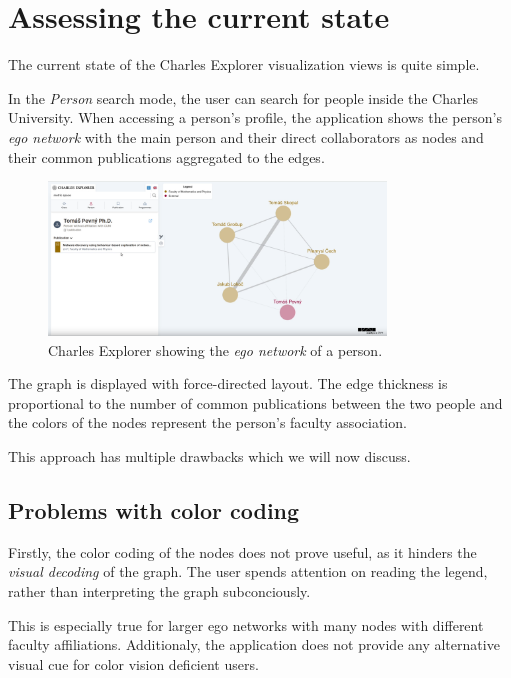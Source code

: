 \section{Assessing the current state} \label{sec:current-state}

The current state of the Charles Explorer visualization views is quite simple. 

In the \textit{Person} search mode, the user can search for people inside the Charles University. 
When accessing a person's profile, the application shows the person's \textit{ego network} with the main person and their direct collaborators 
as nodes and their common publications aggregated to the edges.

\begin{figure}[ht!]
    \captionsetup{width=.9\linewidth}
    \includegraphics[width=0.8\textwidth]{../img/charles-explorer-old-view.png}
    \centering
    \caption{Charles Explorer showing the \textit{ego network} of a person.}
\end{figure}

The graph is displayed with force-directed layout. The edge thickness is proportional to the number of common publications between 
the two people and the colors of the nodes represent the person's faculty association.

This approach has multiple drawbacks which we will now discuss.

\subsection{Problems with color coding} \label{sec:color-coding}

Firstly, the color coding of the nodes does not prove useful, as it hinders the \textit{visual decoding} of the graph.
The user spends attention on reading the legend, rather than interpreting the graph subconciously.

This is especially true for larger ego networks with many nodes with different faculty affiliations. 
Additionaly, the application does not provide any alternative visual cue for color vision deficient users.


